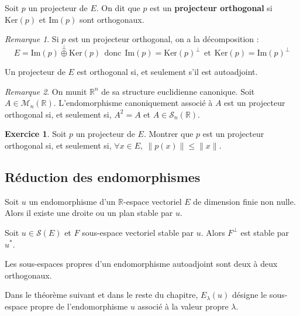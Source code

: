 \documentclass[french]{article}
\newcommand{\R}{\mathbb{R}}
\newcommand{\st}{^*}
\renewcommand{\ker}{\text{Ker}}
\theoremstyle{plain}
\theoremstyle{definition}
\newtheorem{exo}{Exercice}
\theoremstyle{remark}
\newtheorem*{rmq}{Remarque}
\begin{document}
\begin{dfn}
	Soit $p$ un projecteur de $E$. On dit que $p$ est un \textbf{projecteur orthogonal} si $\ker(p)$ et $\text{Im}(p)$ sont orthogonaux.
\end{dfn}

\begin{rmq}
	Si $p$ est un projecteur orthogonal, on a la décomposition : $$E=\text{Im}(p)\overset{\bot}{\oplus}\ker(p)\ \ \text{donc} \ \ \text{Im}(p)=\ker(p)^\bot\ \ \text{et}\ \ \ker(p)=\text{Im}(p)^\bot$$
\end{rmq}

\begin{thm}{}
	Un projecteur de $E$ est orthogonal si, et seulement s'il est autoadjoint.
\end{thm}

\begin{rmq}
	On munit $\R^n$ de sa structure euclidienne canonique. Soit $A\in\mathcal{M}_n(\R)$. L'endomorphisme canoniquement associé à $A$ est un projecteur orthogonal si, et seulement si, $A^2=A$ et $A\in\mathcal{S}_n(\R)$.
\end{rmq}

\begin{exo}
	Soit $p$ un projecteur de $E$. Montrer que $p$ est un projecteur orthogonal si, et seulement si, $\forall x\in E,\ \lVert p(x)\rVert\leqslant\lVert x\rVert$.
\end{exo}

\subsection{Réduction des endomorphismes}

\begin{thm}{}
	Soit $u$ un endomorphisme d'un $\R$-espace vectoriel $E$ de dimension finie non nulle. Alors il existe une droite ou un plan stable par $u$.
\end{thm}

\begin{thm}{}
	Soit $u\in\mathcal{S}(E)$ et $F$ sous-espace vectoriel stable par $u$. Alors $F^\bot$ est stable par $u\st$.
\end{thm}

\begin{thm}{}
	Les sous-espaces propres d'un endomorphisme autoadjoint sont deux à deux orthogonaux.
\end{thm}

Dans le théorème suivant et dans le reste du chapitre, $E_\lambda(u)$ désigne le sous-espace propre de l'endomorphisme $u$ associé à la valeur propre $\lambda$.
\end{document}
